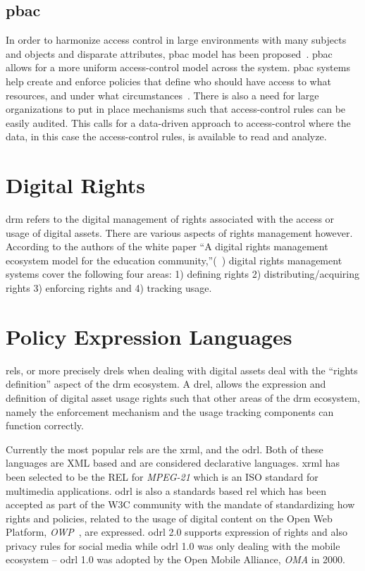 \subsection{\ac{pbac}}
In order to harmonize access control in large environments with many subjects and objects and disparate attributes, \ac{pbac} model has been proposed~\cite{nist}. \ac{pbac} allows for a more uniform access-control model across the system. \ac{pbac} systems help create and enforce policies
that define who should have access to what resources, and under what circumstances~\cite{nist}.
There is also a need for large organizations to put in place mechanisms such that access-control rules can be easily audited. This calls for a data-driven approach to access-control where the data, in this case the access-control rules, is available to read and analyze.

\section{Digital Rights} 

\ac{drm} refers to the digital management of rights associated with the access or usage of digital assets. There are various aspects of rights management however. According to the authors of the white paper ``A digital rights management ecosystem model for the education community,''(~\cite{collier})
 digital rights management systems cover the following four areas: 1) defining rights 2) distributing/acquiring rights 3) enforcing rights and 4) tracking usage.

\section{Policy Expression Languages}

\ac{rel}s, or more precisely \ac{drel}s when dealing with digital assets deal with the ``rights definition'' aspect of the \ac{drm} ecosystem. A \ac{drel}, allows the expression and definition of digital asset usage rights such that other areas of the \ac{drm} ecosystem, namely the enforcement mechanism and the usage tracking components can function correctly.

Currently the most popular \ac{rel}s are the \ac{xrml}, and the \ac{odrl}. Both of these languages are XML based and are considered declarative languages. \ac{xrml} has been selected to be the REL for \emph{MPEG-21} which is an ISO standard for multimedia applications. \ac{odrl} is also a standards based \ac{rel} which has been accepted as part of the W3C community with the mandate of standardizing how rights and policies, related to the usage of digital content on the Open Web Platform, \emph{OWP}~\cite{openwebplatform}, are expressed. \ac{odrl} 2.0 supports expression of rights and also privacy rules for social media while \ac{odrl} 1.0 was only dealing with the mobile ecosystem -- \ac{odrl} 1.0 was adopted by the Open Mobile Alliance, \emph{OMA} in 2000.

